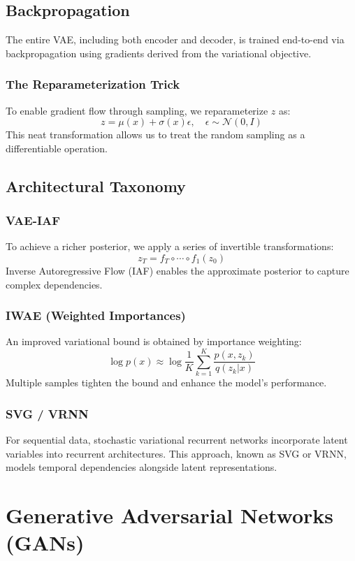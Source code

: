 \documentclass{article}
\begin{document}
\subsection{Backpropagation}
The entire VAE, including both encoder and decoder, is trained end-to-end via backpropagation using gradients derived from the variational objective.

\subsubsection{The Reparameterization Trick}
To enable gradient flow through sampling, we reparameterize \(z\) as:
\[
z = \mu(x) + \sigma(x)\epsilon, \quad \epsilon \sim \mathcal{N}(0, I)
\]
This neat transformation allows us to treat the random sampling as a differentiable operation.

\subsection{Architectural Taxonomy}

\subsubsection{VAE-IAF}
To achieve a richer posterior, we apply a series of invertible transformations:
\[
z_T = f_T \circ \cdots \circ f_1(z_0)
\]
Inverse Autoregressive Flow (IAF) enables the approximate posterior to capture complex dependencies.

\subsubsection{IWAE (Weighted Importances)}
An improved variational bound is obtained by importance weighting:
\[
\log p(x) \approx \log \frac{1}{K} \sum_{k=1}^{K} \frac{p(x,z_k)}{q(z_k|x)}
\]
Multiple samples tighten the bound and enhance the model's performance.

\subsubsection{SVG / VRNN }
For sequential data, stochastic variational recurrent networks incorporate latent variables into recurrent architectures. This approach, known as SVG or VRNN, models temporal dependencies alongside latent representations.

\clearpage\newpage

\section{Generative Adversarial Networks (GANs)} \label{sec:gan}
\end{document}

